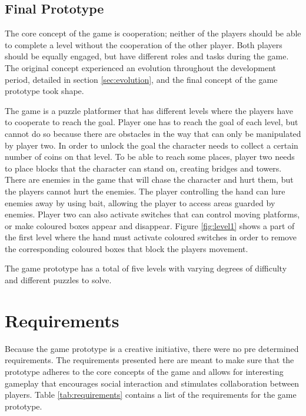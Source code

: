 

\subsection{Final Prototype}
\label{sec:concept_final}
The core concept of the game is cooperation; neither of the players should be able to complete a level without the cooperation of the other player. Both players should be equally engaged, but have different roles and tasks during the game. The original concept experienced an evolution throughout the development period, detailed in section \ref{sec:evolution}, and the final concept of the game prototype took shape. 

The game is a puzzle platformer that has different levels where the players have to cooperate to reach the goal. Player one has to reach the goal of each level, but cannot do so because there are obstacles in the way that can only be manipulated by player two. In order to unlock the goal the character needs to collect a certain number of coins on that level. To be able to reach some places, player two needs to place blocks that the character can stand on, creating bridges and towers. There are enemies in the game that will chase the character and hurt them, but the players cannot hurt the enemies. The player controlling the hand can lure enemies away by using bait, allowing the player to access areas guarded by enemies. Player two can also activate switches that can control moving platforms, or make coloured boxes appear and disappear. Figure \ref{fig:level1} shows a part of the first level where the hand must activate coloured switches in order to remove the corresponding coloured boxes that block the players movement.

The game prototype has a total of five levels with varying degrees of difficulty and different puzzles to solve.





\section{Requirements}
Because the game prototype is a creative initiative, there were no pre determined requirements. The requirements presented here are meant to make sure that the prototype adheres to the core concepts of the game and allows for interesting gameplay that encourages social interaction and stimulates collaboration between players. Table \ref{tab:requirements} contains a list of the requirements for the game prototype. 



